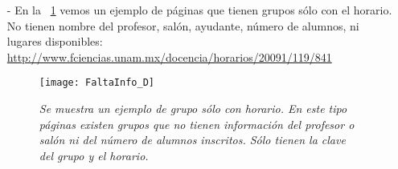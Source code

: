 \begin{itemize}
\item[-] En la \figurename{~\ref{SoloHorario}} vemos un ejemplo de páginas que tienen grupos sólo con el horario. No tienen nombre del profesor, salón, ayudante, número de alumnos, ni lugares disponibles: \url{http://www.fciencias.unam.mx/docencia/horarios/20091/119/841} %

\begin{figure}[H]
\centering
\texttt{[image: FaltaInfo\_D]} %
\caption[\textit{Ejemplo de grupo sólo con horario}]{\textit{Se muestra un ejemplo de grupo sólo con horario. En este tipo páginas existen grupos que no tienen información del profesor o salón ni del número de alumnos inscritos. Sólo tienen la clave del grupo y el horario.}}\label{SoloHorario}
\end{figure}
\end{itemize}